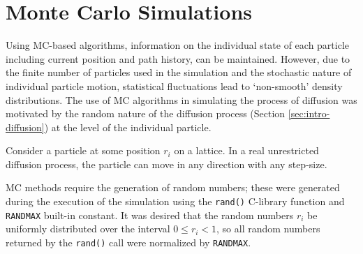 	
	
	
%	
%	
%	
	


\section{Monte Carlo Simulations}

	Using MC-based algorithms, information on the individual state of each particle including current position and path history, can be maintained. However, due to the finite number of particles used in the simulation and the stochastic nature of individual particle motion, statistical fluctuations lead to `non-smooth' density distributions. The use of MC algorithms in simulating the process of diffusion was motivated by the random nature of the diffusion process (Section \ref{sec:intro-diffusion}) at the level of the individual particle.
	
	Consider a particle at some position $ r_i $ on a lattice. In a real unrestricted diffusion process, the particle can move in any direction with any step-size. 
	
	MC methods require the generation of random numbers; these were generated during the execution of the simulation using the \texttt{rand()} C-library function and \texttt{RAND\textunderscore MAX} built-in constant. It was desired that the random numbers $ r_i $ be uniformly distributed over the interval $ 0 \leq r_i < 1 $, so all random numbers returned by the \texttt{rand()} call were normalized by \texttt{RAND\textunderscore MAX}.
	
